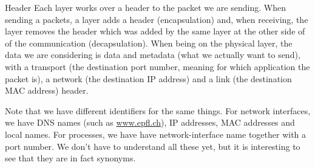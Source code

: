 \documentclass[a4paper]{article}
\begin{document}
\begin{parag}{Header}
    Each layer works over a header to the packet we are sending. When sending a packets, a layer adds a header (encapsulation) and, when receiving, the layer removes the header which was added by the same layer at the other side of of the communication (decapsulation). When being on the physical layer, the data we are considering is data and metadata (what we actually want to send), with a transport (the destination port number, meaning for which application the packet is), a network (the destination IP address) and a link (the destination MAC address) header.

    Note that we have different identifiers for the same things. For network interfaces, we have DNS names (such as \url{www.epfl.ch}), IP addresses, MAC addresses and local names. For processes, we have have network-interface name together with a port number. We don't have to understand all these yet, but it is interesting to see that they are in fact synonyms.
\end{parag}
\end{document}
